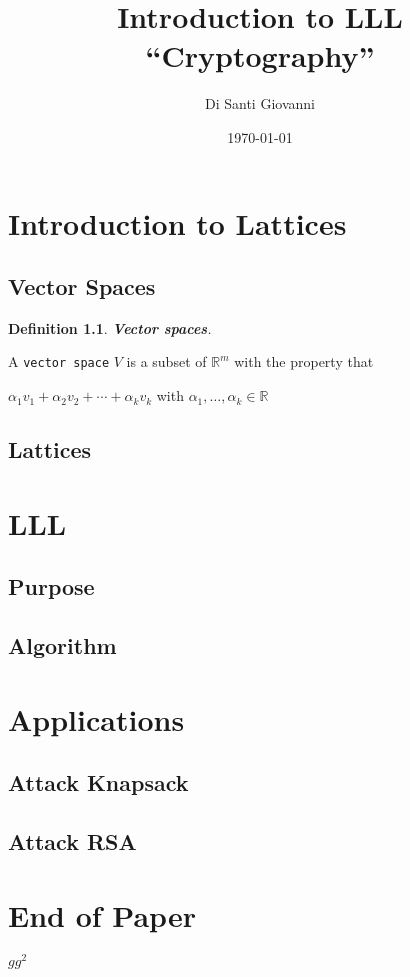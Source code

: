 \documentclass[a4paper,12pt]{report}
\title{Introduction to LLL\\``Cryptography''}
\author{Di Santi Giovanni}
\date{\today}
\newtheorem{definition}{Definition}[section]
\newcommand{\R}{\mathbb{R}}
\begin{document}
 
\maketitle

\tableofcontents

\chapter{Introduction to Lattices}

\section{Vector Spaces}

\begin{definition}
    \textbf{Vector spaces}.
\end{definition}
A \texttt{vector space} $V$ is a subset of $\R^{m}$ with the property that

\begin{center}
    $\alpha_1v_1 + \alpha_2v_2 + \cdots + \alpha_kv_k$ with $\alpha_1, \ldots, \alpha_k \in \R$
\end{center}

\section{Lattices}

\chapter{LLL}

\section{Purpose}

\section{Algorithm}

\chapter{Applications}

\section{Attack Knapsack}

\section{Attack RSA}

\chapter*{End of Paper}

$gg^2$



\end{document}
